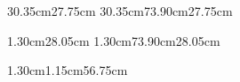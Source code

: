 \documentclass{tehran-poster}
\newlength\ColRight
\newlength\ColLeft
\begin{document}
\PosterBackground
\PosterHeader

%
\setlength\ColRight{11.55cm}
\setlength\ColLeft{11.55cm}
\newcommand{\PosterColumnBottom}{73.90cm}

  {30.35cm}{\ColRight}{27.75cm}{\IntroductionContent}%
\addtolength\ColRight{\PosterBlockHeight}\addtolength\ColRight{.50cm}
  {30.35cm}{\ColRight}{\PosterColumnBottom}{27.75cm}{\MethodContent}

  {1.30cm}{\ColLeft}{28.05cm}{\ResultsContent}%
\addtolength\ColLeft{\PosterBlockHeight}\addtolength\ColLeft{.50cm}
  {1.30cm}{\ColLeft}{\PosterColumnBottom}{28.05cm}{\ConclusionContent}

\renewcommand{\PosterTitleSize}{38}%
  {1.30cm}{1.15cm}{56.75cm}{\ReferencesContent}

\null
\end{document}
